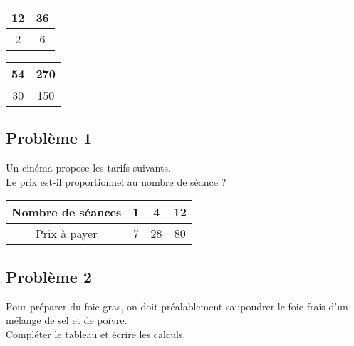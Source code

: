 \begin{multicols}{2}\noindent 
  \begin{center}\begin{tabular}{|c|c|}  \hline
    12 & 36 \\  \hline
    2 & 6 \\  \hline
  \end{tabular}\end{center}

  \Pointilles[5]  \columnbreak 

  \begin{center}\begin{tabular}{|c|c|} \hline
    54 & 270 \\  \hline
    30 & 150 \\  \hline
  \end{tabular}\end{center}

  \Pointilles[5] 

\end{multicols}

\newpage

\subsection*{Problème 1}

\begin{multicols}{2}\noindent

Un cinéma propose les tarifs suivants. \\
Le prix est-il proportionnel au nombre de séance ?


\begin{center}\begin{tabular}{|c|c|c|c|} \hline
  Nombre de séances & 1 &  4 & 12 \\  \hline
  Prix à payer      & 7 & 28 & 80\\  \hline
\end{tabular}\end{center}  \columnbreak 

\Pointilles[5] 

\end{multicols}

\subsection*{Problème 2}

Pour préparer du foie gras, on doit préalablement saupoudrer le foie frais d'un mélange de sel et de poivre. \\
Compléter le tableau et écrire les calculs.

